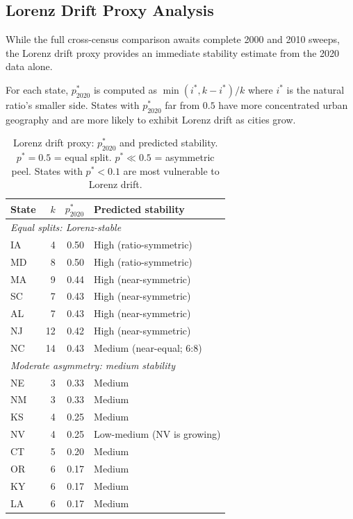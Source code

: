 \subsection{Lorenz Drift Proxy Analysis}
\label{sec:lorenz-analysis}

While the full cross-census comparison awaits complete 2000 and 2010 sweeps,
the Lorenz drift proxy provides an immediate stability estimate from the 2020
data alone.

For each state, $p^*_{2020}$ is computed as $\min(i^*, k-i^*)/k$ where
$i^*$ is the natural ratio's smaller side.
States with $p^*_{2020}$ far from $0.5$ have more concentrated urban geography
and are more likely to exhibit Lorenz drift as cities grow.

\begin{table}[h]
\centering
\caption{Lorenz drift proxy: $p^*_{2020}$ and predicted stability.
  $p^* = 0.5$ = equal split. $p^* \ll 0.5$ = asymmetric peel.
  States with $p^* < 0.1$ are most vulnerable to Lorenz drift.}
\label{tab:lorenz-proxy}
\small
\begin{tabular}{l r r l}
\toprule
State & $k$ & $p^*_{2020}$ & Predicted stability \\
\midrule
\multicolumn{4}{l}{\textit{Equal splits: Lorenz-stable}} \\
IA  & 4 & 0.50 & High (ratio-symmetric) \\
MD  & 8 & 0.50 & High (ratio-symmetric) \\
MA  & 9 & 0.44 & High (near-symmetric) \\
SC  & 7 & 0.43 & High (near-symmetric) \\
AL  & 7 & 0.43 & High (near-symmetric) \\
NJ  & 12 & 0.42 & High (near-symmetric) \\
NC  & 14 & 0.43 & Medium (near-equal; 6:8) \\
\midrule
\multicolumn{4}{l}{\textit{Moderate asymmetry: medium stability}} \\
NE  & 3 & 0.33 & Medium \\
NM  & 3 & 0.33 & Medium \\
KS  & 4 & 0.25 & Medium \\
NV  & 4 & 0.25 & Low-medium (NV is growing) \\
CT  & 5 & 0.20 & Medium \\
OR  & 6 & 0.17 & Medium \\
KY  & 6 & 0.17 & Medium \\
LA  & 6 & 0.17 & Medium \\
\midrule

\end{tabular}
\end{table}
